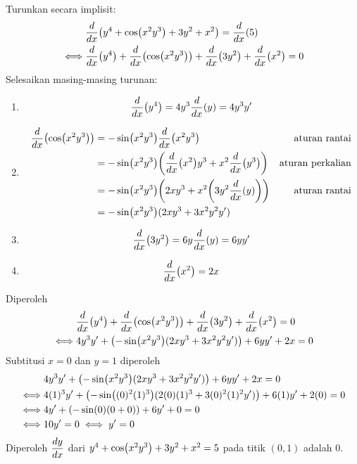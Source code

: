 \begin{enumerate}[leftmargin=*, label={\arabic*}.]
\begin{enumerate}[label={\alph*}.]
    Turunkan secara implisit:
    \begin{align*}
        &\drv{x}{y^{4}+\cos\bracket*{x^{2}y^{3}}+3y^{2}+x^{2}}=\drv{x}{5}\\
        \iff &\drv{x}{y^{4}}+\drv{x}{\cos\bracket*{x^{2}y^{3}}}
        +\drv{x}{3y^{2}}+\drv{x}{x^{2}} = 0
    \end{align*}
    Selesaikan masing-masing turunan:
    \begin{enumerate}[label={\arabic*})]
    \item \[
    \drv{x}{y^{4}} = 4y^{3}\drv{x}{y} = 4y^{3}y'
    \]
    \item \begin{align*}
        \drv{x}{\cos\bracket*{x^{2}y^{3}}} 
        &= -\sin\bracket*{x^{2}y^{3}}\drv{x}{x^{2}y^{3}}
        &\text{aturan rantai}\\
        &= -\sin\bracket*{x^{2}y^{3}}\bracket*{\drv{x}{x^{2}}y^{3}+x^{2}\drv{x}{y^{3}}}
        &\text{aturan perkalian}\\
        &= -\sin\bracket*{x^{2}y^{3}}\bracket*{2xy^{3}+x^{2}\bracket*{3y^{2}\drv{x}{y}}}
        &\text{aturan rantai}\\
        &= -\sin\bracket*{x^{2}y^{3}}(2xy^{3}+3x^{2}y^{2}y')
    \end{align*}
    \item \[
    \drv{x}{3y^{2}} = 6y\drv{x}{y} = 6yy'
    \]
    \item \[
    \drv{x}{x^{2}} = 2x
    \]
    \end{enumerate}
    Diperoleh
    \begin{align*}
        &\drv{x}{y^{4}}+\drv{x}{\cos\bracket*{x^{2}y^{3}}}
        +\drv{x}{3y^{2}}+\drv{x}{x^{2}} = 0\\
        \iff &4y^{3}y'
        +\bracket*{-\sin\bracket*{x^{2}y^{3}}(2xy^{3}+3x^{2}y^{2}y')}+6yy'+2x=0
    \end{align*}
    Subtitusi $x=0$ dan $y=1$ diperoleh
    \begin{align*}
        &4y^{3}y'
        +\bracket*{-\sin\bracket*{x^{2}y^{3}}(2xy^{3}+3x^{2}y^{2}y')}+6yy'+2x=0\\
        \iff &4(1)^{3}y'
        +\bracket*{-\sin\bracket*{(0)^{2}(1)^{3}}(2(0)(1)^{3}+3(0)^{2}(1)^{2}y')}+6(1)y'
        +2(0)=0\\
        \iff &4y'+(-\sin(0)(0+0))+6y'+0=0 \\
        \iff &10y'=0 \iff y'=0
    \end{align*}
    Diperoleh $\displaystyle\frac{dy}{dx}$ dari 
    $y^{4}+\cos\bracket*{x^{2}y^{3}}+3y^{2}+x^{2}=5$ pada titik $(0,1)$ adalah $0$.


\end{enumerate}
\end{enumerate}

